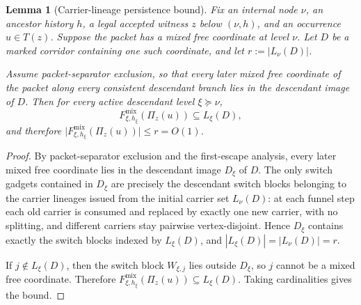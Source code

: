 \documentclass[11pt]{article}
\newtheorem{lemma}[theorem]{Lemma}
\begin{document}
\begin{lemma}[Carrier-lineage persistence bound]
\label{lem:carrier-lineage-persistence}
Fix an internal node $\nu$, an ancestor history $h$, a legal accepted
witness $z$ below $(\nu,h)$, and an occurrence $u \in T(z)$.  Suppose
the packet has a mixed free coordinate at level $\nu$.  Let $D$ be a
marked corridor containing one such coordinate, and let
$r := |L_\nu(D)|$.

Assume packet-separator exclusion, so that every later mixed free
coordinate of the packet along every consistent descendant branch lies
in the descendant image of $D$.  Then for every active descendant
level $\xi \succeq \nu$,
\[
F_{\xi,h_\xi}^{\mathrm{mix}}(\Pi_z(u)) \subseteq L_\xi(D),
\]
and therefore
$\bigl|F_{\xi,h_\xi}^{\mathrm{mix}}(\Pi_z(u))\bigr| \le r = O(1)$.
\end{lemma}

\begin{proof}
By packet-separator exclusion and the first-escape analysis, every later
mixed free coordinate lies in the descendant image $D_\xi$ of $D$.  The
only switch gadgets contained in $D_\xi$ are precisely the descendant
switch blocks belonging to the carrier lineages issued from the initial
carrier set $L_\nu(D)$: at each funnel step each old carrier is consumed
and replaced by exactly one new carrier, with no splitting, and different
carriers stay pairwise vertex-disjoint.  Hence $D_\xi$ contains exactly
the switch blocks indexed by $L_\xi(D)$, and
$|L_\xi(D)| = |L_\nu(D)| = r$.

If $j \notin L_\xi(D)$, then the switch block $W_{\xi,j}$ lies outside
$D_\xi$, so $j$ cannot be a mixed free coordinate.  Therefore
$F_{\xi,h_\xi}^{\mathrm{mix}}(\Pi_z(u)) \subseteq L_\xi(D)$.
Taking cardinalities gives the bound.
\end{proof}

%
\end{document}
